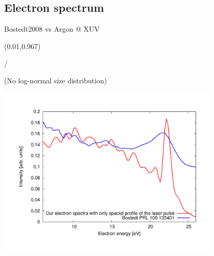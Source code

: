 \documentclass{beamer}
\makeatletter
\newcommand{\framenumber}{
\begin{textblock}{0}(0.01,0.967)
\begin{scriptsize}
{\color{gray}\insertframenumber/\inserttotalframenumber}
\end{scriptsize}
\end{textblock}
}
\makeatother
\begin{document}
\subsection{Electron spectrum}
\begin{frame}{Bostedt2008 vs Argon @ XUV}\framenumber
(No log-normal size distribution)

\begin{center}
\includegraphics[width=0.8\textwidth]{figures/appendix/e_spec}
\end{center}
\end{frame}

\end{document}
